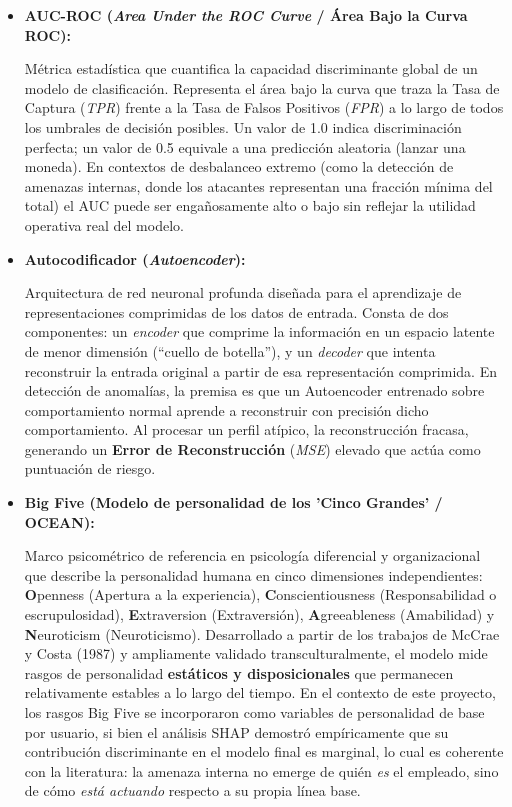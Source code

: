 \documentclass[IB]{TFUOC}%
\begin{document}
\begin{itemize}
    \item \textbf{AUC-ROC (\textit{Area Under the ROC Curve} / Área Bajo la Curva ROC):}
    
    Métrica estadística que cuantifica la capacidad discriminante global de un modelo de clasificación. Representa el área bajo la curva que traza la Tasa de Captura (\textit{TPR}) frente a la Tasa de Falsos Positivos (\textit{FPR}) a lo largo de todos los umbrales de decisión posibles. Un valor de 1.0 indica discriminación perfecta; un valor de 0.5 equivale a una predicción aleatoria (lanzar una moneda). En contextos de desbalanceo extremo (como la detección de amenazas internas, donde los atacantes representan una fracción mínima del total) el AUC puede ser engañosamente alto o bajo sin reflejar la utilidad operativa real del modelo.

    \item \textbf{Autocodificador (\textit{Autoencoder}):}
    
    Arquitectura de red neuronal profunda diseñada para el aprendizaje de representaciones comprimidas de los datos de entrada. Consta de dos componentes: un \textit{encoder} que comprime la información en un espacio latente de menor dimensión (``cuello de botella''), y un \textit{decoder} que intenta reconstruir la entrada original a partir de esa representación comprimida. En detección de anomalías, la premisa es que un Autoencoder entrenado sobre comportamiento normal aprende a reconstruir con precisión dicho comportamiento. Al procesar un perfil atípico, la reconstrucción fracasa, generando un \textbf{Error de Reconstrucción} (\textit{MSE}) elevado que actúa como puntuación de riesgo.

    \item \textbf{Big Five (Modelo de personalidad de los 'Cinco Grandes' / OCEAN):}
    
    Marco psicométrico de referencia en psicología diferencial y organizacional que describe la personalidad humana en cinco dimensiones independientes: \textbf{O}penness (Apertura a la experiencia), \textbf{C}onscientiousness (Responsabilidad o escrupulosidad), \textbf{E}xtraversion (Extraversión), \textbf{A}greeableness (Amabilidad) y \textbf{N}euroticism (Neuroticismo). Desarrollado a partir de los trabajos de McCrae y Costa (1987) y ampliamente validado transculturalmente, el modelo mide rasgos de personalidad \textbf{estáticos y disposicionales} que permanecen relativamente estables a lo largo del tiempo. En el contexto de este proyecto, los rasgos Big Five se incorporaron como variables de personalidad de base por usuario, si bien el análisis SHAP demostró empíricamente que su contribución discriminante en el modelo final es marginal, lo cual es coherente con la literatura: la amenaza interna no emerge de quién \textit{es} el empleado, sino de cómo \textit{está actuando} respecto a su propia línea base.


\end{itemize}
\end{document}
